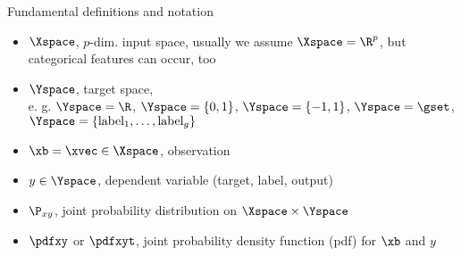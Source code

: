 







  
\begin{vbframe}{Fundamental definitions and notation}

\begin{itemize}
\item $\Xspace$, $p$-dim. input space, usually we assume $\Xspace = \R^p$, but
categorical features can occur, too
\item $\Yspace$, target space,  \\
e. g. $\Yspace = \R$, $\Yspace = \lbrace 0, 1 \rbrace$, $\Yspace = \lbrace -1, 1 \rbrace$, $\Yspace = \gset$, $\Yspace = \lbrace \textrm{label}_1, \ldots, \textrm{label}_g \rbrace$
  \item $\xb = \xvec \in \Xspace$, observation
\item $y \in \Yspace$, dependent variable (target, label, output)
\item $\P_{xy}$, joint probability distribution on $\Xspace \times \Yspace$
  \item $\pdfxy$ or $\pdfxyt$, joint probability density function (pdf) for $\xb$ and $y$
  \end{itemize}




\framebreak


\end{vbframe}

